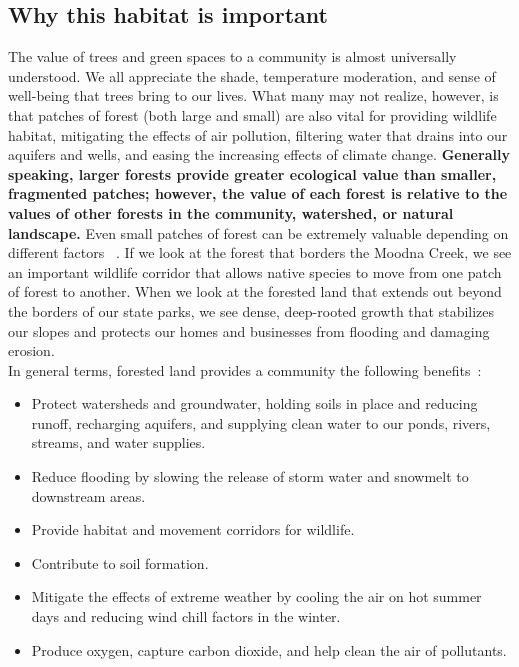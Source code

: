\subsection*{Why this habitat is important}
The value of trees and green spaces to a community is almost universally
understood. We all appreciate the shade, temperature moderation, and sense of
well-being that trees bring to our lives. What many may not realize, however,
is that patches of forest (both large and small) are also vital for providing
wildlife habitat, mitigating the effects of air pollution, filtering water that
drains into our aquifers and wells, and easing the increasing effects of
climate change. \textbf{Generally speaking, larger forests provide greater
ecological value than smaller, fragmented patches; however, the value of each
forest is relative to the values of other forests in the community, watershed,
or natural landscape.} Even small patches of forest can be extremely valuable
depending on different factors ~\citep{haeckel2014}. If we look at the forest
that borders the Moodna Creek, we see an important wildlife corridor that
allows native species to move from one patch of forest to another. When we look
at the forested land that extends out beyond the borders of our state parks, we
see dense, deep-rooted growth that stabilizes our slopes and protects our homes
and businesses from flooding and damaging erosion.\\
In general terms, forested land provides a community the following benefits~\citep{bradfordcc}:
\begin{itemize}
    \item Protect watersheds and groundwater, holding soils in place and 
    reducing runoff, recharging aquifers, and supplying clean water to our 
    ponds, rivers, streams, and water supplies.
    \item Reduce flooding by slowing the release of storm water and snowmelt to downstream areas.
    \item Provide habitat and movement corridors for wildlife.
    \item Contribute to soil formation.
    \item Mitigate the effects of extreme weather by cooling the air on hot summer days and reducing wind chill factors in the winter.
    \item Produce oxygen, capture carbon dioxide, and help clean the air of pollutants.
\end{itemize}
